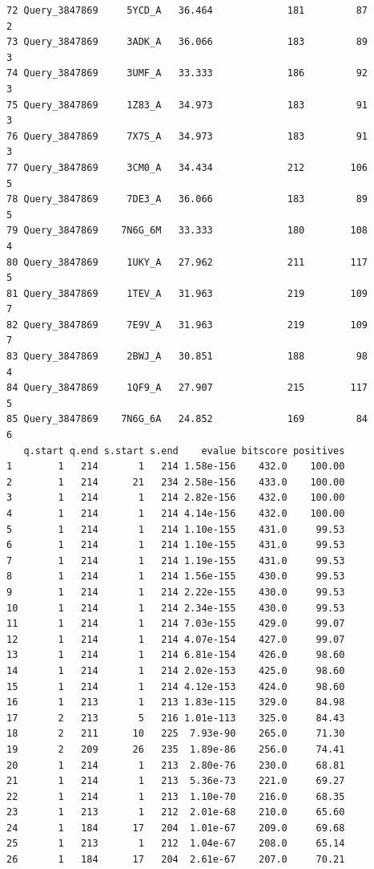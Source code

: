\documentclass[
  letterpaper,
  DIV=11,
  numbers=noendperiod]{scrartcl}
\begin{document}
\begin{verbatim}
72 Query_3847869     5YCD_A   36.464             181         87        2
73 Query_3847869     3ADK_A   36.066             183         89        3
74 Query_3847869     3UMF_A   33.333             186         92        3
75 Query_3847869     1Z83_A   34.973             183         91        3
76 Query_3847869     7X7S_A   34.973             183         91        3
77 Query_3847869     3CM0_A   34.434             212        106        5
78 Query_3847869     7DE3_A   36.066             183         89        5
79 Query_3847869    7N6G_6M   33.333             180        108        4
80 Query_3847869     1UKY_A   27.962             211        117        5
81 Query_3847869     1TEV_A   31.963             219        109        7
82 Query_3847869     7E9V_A   31.963             219        109        7
83 Query_3847869     2BWJ_A   30.851             188         98        4
84 Query_3847869     1QF9_A   27.907             215        117        5
85 Query_3847869    7N6G_6A   24.852             169         84        6
   q.start q.end s.start s.end    evalue bitscore positives
1        1   214       1   214 1.58e-156    432.0    100.00
2        1   214      21   234 2.58e-156    433.0    100.00
3        1   214       1   214 2.82e-156    432.0    100.00
4        1   214       1   214 4.14e-156    432.0    100.00
5        1   214       1   214 1.10e-155    431.0     99.53
6        1   214       1   214 1.10e-155    431.0     99.53
7        1   214       1   214 1.19e-155    431.0     99.53
8        1   214       1   214 1.56e-155    430.0     99.53
9        1   214       1   214 2.22e-155    430.0     99.53
10       1   214       1   214 2.34e-155    430.0     99.53
11       1   214       1   214 7.03e-155    429.0     99.07
12       1   214       1   214 4.07e-154    427.0     99.07
13       1   214       1   214 6.81e-154    426.0     98.60
14       1   214       1   214 2.02e-153    425.0     98.60
15       1   214       1   214 4.12e-153    424.0     98.60
16       1   213       1   213 1.83e-115    329.0     84.98
17       2   213       5   216 1.01e-113    325.0     84.43
18       2   211      10   225  7.93e-90    265.0     71.30
19       2   209      26   235  1.89e-86    256.0     74.41
20       1   214       1   213  2.80e-76    230.0     68.81
21       1   214       1   213  5.36e-73    221.0     69.27
22       1   214       1   213  1.10e-70    216.0     68.35
23       1   213       1   212  2.01e-68    210.0     65.60
24       1   184      17   204  1.01e-67    209.0     69.68
25       1   213       1   212  1.04e-67    208.0     65.14
26       1   184      17   204  2.61e-67    207.0     70.21

\end{verbatim}
\end{document}
